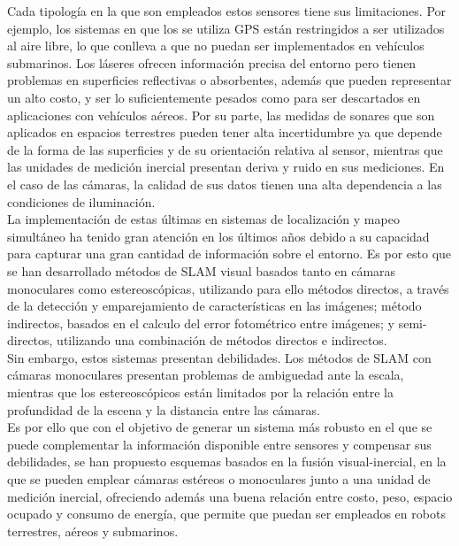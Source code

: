 Cada tipología en la que son empleados estos sensores tiene sus limitaciones. Por ejemplo, los sistemas en que los se utiliza GPS están restringidos a ser utilizados al aire libre, lo que conlleva a que no puedan ser implementados en vehículos submarinos. Los láseres ofrecen información precisa del entorno pero tienen problemas en superficies reflectivas o absorbentes, además que pueden representar un alto costo,  y  ser lo suficientemente pesados como para ser descartados en aplicaciones con  vehículos aéreos. Por su parte, las medidas de sonares que son aplicados en espacios terrestres pueden tener alta incertidumbre ya que depende de la forma de las superficies y de su orientación relativa al sensor, mientras que las unidades de medición inercial presentan deriva y ruido en sus mediciones. En el caso de las cámaras, la  calidad de sus datos tienen una alta dependencia a las condiciones de iluminación. \\

La implementación de estas últimas en sistemas de localización y mapeo simultáneo ha tenido gran atención en los últimos años debido a su capacidad para capturar una gran cantidad de información sobre el entorno. Es por esto que se han desarrollado métodos de SLAM visual basados tanto en cámaras monoculares como estereoscópicas, utilizando para ello métodos directos, a través de la detección y emparejamiento de características en las imágenes; método indirectos, basados en el calculo del error fotométrico entre imágenes; y semi-directos, utilizando una combinación de métodos directos e indirectos.\\

Sin embargo, estos sistemas presentan debilidades. Los métodos de SLAM con cámaras monoculares presentan problemas de ambiguedad ante la escala, mientras que  los estereoscópicos están limitados por la relación entre la profundidad de la escena y la distancia entre las cámaras. \\

Es por ello que con el objetivo de generar un sistema más robusto en el que se puede complementar la información disponible entre sensores y compensar sus debilidades, se han propuesto esquemas basados en la fusión visual-inercial, en la que se pueden emplear cámaras estéreos o monoculares junto a una unidad de medición inercial, ofreciendo además una buena relación entre costo, peso, espacio ocupado y consumo de energía, que permite que puedan ser empleados en robots terrestres, aéreos y submarinos.\\

